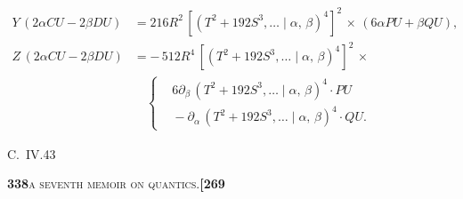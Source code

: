 \documentclass[11pt]{article}
\newcommand{\Cdel}{\mid}
\begin{document}
\[\begin{aligned}
   Y\,(2\alpha C U - 2\beta D U) &= 216 R^2\,[(T^2 + 192 S^3,\ldots\Cdel\alpha,\,\beta)^4]^2\,\times\,(6\alpha P U + \beta Q U),\\
   Z\,(2\alpha C U - 2\beta D U) &= -\,512 R^4\,[(T^2 + 192 S^3,\ldots\Cdel\alpha,\,\beta)^4]^2\,\times\\
                                  &\quad\left\{\begin{aligned}&6\partial_\beta\,(T^2 + 192 S^3,\ldots\Cdel\alpha,\,\beta)^4\cdot P U\\ &{} - \partial_\alpha\,(T^2 + 192 S^3,\ldots\Cdel\alpha,\,\beta)^4\cdot Q U.\end{aligned}\right.
\end{aligned}
\]

\hfill C.~IV.\hfill 43

\newpage
\setcounter{page}{338}

\noindent\textbf{338}\hfill\textsc{a seventh memoir on quantics.}\hfill\textbf{[269}
\end{document}
